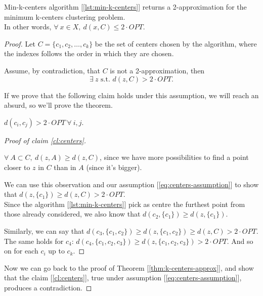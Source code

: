 \begin{thm}\label{thm:k-centers-approx}
    Min-k-centers algorithm [\ref{lst:min-k-centers}] returns a 2-approximation for the minimum k-centers clustering problem.\\
    In other words, $\forall\ x \in X,\ d(x,C) \leq 2 \cdot OPT$.
\end{thm}
\begin{proof}
    Let $C = \{c_1, c_2, \ldots, c_k\}$ be the set of centers chosen by the algorithm, where the indexes follows the order in which they are chosen.
    
    Assume, by contradiction, that $C$ is not a 2-approximation, then 
    \begin{equation}\label{eq:centers-assumption}
        \exists\ z \text{ s.t. } d(z, C) > 2 \cdot OPT.
    \end{equation}
    
    If we prove that the following claim holds under this assumption, we will reach an absurd, so we'll prove the theorem.
    \begin{claim}\label{cl:centers}
        $d(c_i, c_j) > 2 \cdot OPT\ \forall\ i,j$.
    \end{claim}
    \begin{proof}[Proof of claim \ref{cl:centers}]
        \begin{obs}
            $\forall\ A \subset C,\ d(z,A) \geq d(z,C)$, since we have more possibilities to find a point closer to $z$ in $C$ than in $A$ (since it's bigger).
        \end{obs}
        We can use this observation and our assumption [\ref{eq:centers-assumption}] to show that $d(z, \{c_1\}) \geq d(z,C) > 2 \cdot OPT$.\\
        Since the algorithm [\ref{lst:min-k-centers}] pick as centre the furthest point from those already considered, we also know that $d(c_2, \{c_1\}) \geq d(z, \{c_1\})$.
        
        Similarly, we can say that $d(c_3, \{c_1, c_2\}) \geq d(z, \{c_1, c_2\}) \geq d(z,C) > 2 \cdot OPT$.
        The same holds for $c_4$: $d(c_4, \{c_1, c_2, c_3\}) \geq d(z, \{c_1, c_2, c_3\}) > 2 \cdot OPT$.
        And so on for each $c_i$ up to $c_k$.
    \end{proof}

    Now we can go back to the proof of Theorem [\ref{thm:k-centers-approx}], and show that the claim [\ref{cl:centers}], true under assumption [\ref{eq:centers-assumption}], produces a contradiction.
    

\end{proof}
